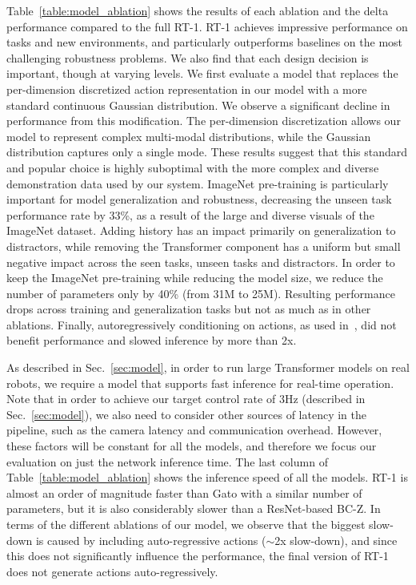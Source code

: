 \documentclass{article} %
\newcommand{\algname}{RT-1\xspace}
\begin{document}
Table~\ref{table:model_ablation} shows the results of each ablation and the delta performance compared to the full \algname.
\algname achieves impressive performance on tasks and new environments, and particularly outperforms baselines on the most challenging robustness problems.
We also find that each design decision is important, though at varying levels. 
We first evaluate a model that replaces the per-dimension discretized action representation in our model with a more standard continuous Gaussian distribution. We observe a significant decline in performance from this modification. 
The per-dimension discretization allows our model to represent complex multi-modal distributions, while the Gaussian distribution captures only a single mode. These results suggest that this standard and popular choice is highly suboptimal with the more complex and diverse demonstration data used by our system.
ImageNet pre-training is particularly important for model generalization and robustness, decreasing the unseen task performance rate by 33\%, as a result of the large and diverse visuals of the ImageNet dataset.
Adding history has an impact primarily on generalization to distractors, while removing the Transformer
component has a uniform but small negative impact across the seen tasks, unseen tasks and distractors.
In order to keep the ImageNet pre-training while reducing the model size, we reduce the number of parameters only by 40\% (from 31M to 25M). 
Resulting performance drops across training and generalization tasks but not as much as in other ablations.
Finally, autoregressively conditioning on actions, as used in~\citep{reed2022generalist, chen2021decision, lee2022multi}, did not benefit performance and slowed inference by more than 2x.

As described in Sec.~\ref{sec:model}, in order to run large Transformer models on real robots, we require a model that supports fast inference for real-time operation. 
Note that in order to achieve our target control rate of $3$Hz (described in Sec.~\ref{sec:model}), we also need to consider other sources of latency in the pipeline, such as the camera latency and communication overhead. However, these factors will be constant for all the models, and therefore we focus our evaluation on just the network inference time.
The last column of Table~\ref{table:model_ablation} shows the inference speed of all the models.
\algname is almost an order of magnitude faster than Gato with a similar number of parameters, but it is also considerably slower than a ResNet-based BC-Z. 
In terms of the different ablations of our model, we observe that the biggest slow-down is caused by including auto-regressive actions ($\sim$2x slow-down), and since this does not significantly influence the performance, the final version of \algname does not generate actions auto-regressively.
\end{document}
